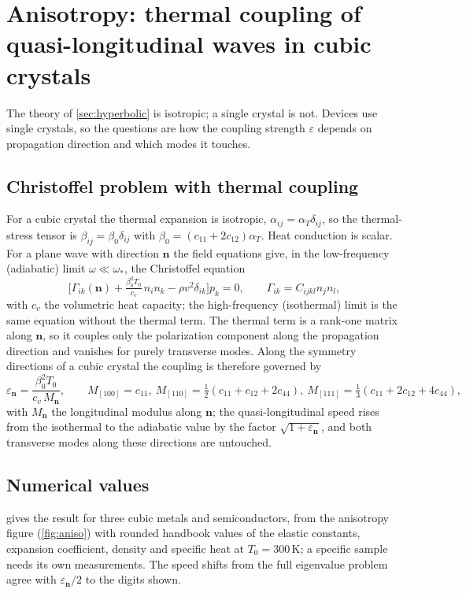 \section{Anisotropy: thermal coupling of quasi-longitudinal waves in cubic crystals}\label{sec:aniso}

The theory of \cref{sec:hyperbolic} is isotropic; a single crystal is not. Devices use single crystals, so the questions are how the coupling strength $\varepsilon$ depends on propagation direction and which modes it touches.

\subsection{Christoffel problem with thermal coupling}
For a cubic crystal the thermal expansion is isotropic, $\alpha_{ij}=\alpha_T\delta_{ij}$, so the thermal-stress tensor is $\beta_{ij}=\beta_0\delta_{ij}$ with $\beta_0=(c_{11}+2c_{12})\alpha_T$. Heat conduction is scalar. For a plane wave with direction $\bm n$ the field equations give, in the low-frequency (adiabatic) limit $\omega\ll\omega_*$, the Christoffel equation
\begin{equation}\label{eq:christ}
\bigl[\Gamma_{ik}(\bm n)+\tfrac{\beta_0^2T_0}{c_v}\,n_in_k-\rho v^2\delta_{ik}\bigr]p_k=0,\qquad \Gamma_{ik}=C_{ijkl}n_jn_l,
\end{equation}
with $c_v$ the volumetric heat capacity; the high-frequency (isothermal) limit is the same equation without the thermal term. The thermal term is a rank-one matrix along $\bm n$, so it couples only the polarization component along the propagation direction and vanishes for purely transverse modes. Along the symmetry directions of a cubic crystal the coupling is therefore governed by
\begin{equation}\label{eq:epsdir}
\varepsilon_{\bm n}=\frac{\beta_0^2T_0}{c_v\,M_{\bm n}},\qquad M_{[100]}=c_{11},\ M_{[110]}=\tfrac12(c_{11}+c_{12}+2c_{44}),\ M_{[111]}=\tfrac13(c_{11}+2c_{12}+4c_{44}),
\end{equation}
with $M_{\bm n}$ the longitudinal modulus along $\bm n$; the quasi-longitudinal speed rises from the isothermal to the adiabatic value by the factor $\sqrt{1+\varepsilon_{\bm n}}$, and both transverse modes along these directions are untouched.

\subsection{Numerical values}
 gives the result for three cubic metals and semiconductors, from the anisotropy figure (\cref{fig:aniso}) with rounded handbook values of the elastic constants, expansion coefficient, density and specific heat at $T_0=300$\,K; a specific sample needs its own measurements. The speed shifts from the full eigenvalue problem agree with $\varepsilon_{\bm n}/2$ to the digits shown.

